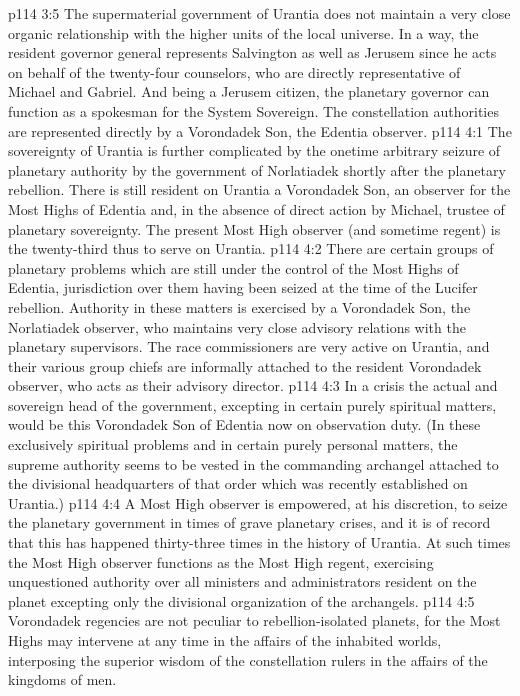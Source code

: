 \vs p114 3:5 The supermaterial government of Urantia does not maintain a very close organic relationship with the higher units of the local universe. In a way, the resident governor general represents Salvington as well as Jerusem since he acts on behalf of the twenty\hyp{}four counselors, who are directly representative of Michael and Gabriel. And being a Jerusem citizen, the planetary governor can function as a spokesman for the System Sovereign. The constellation authorities are represented directly by a Vorondadek Son, the Edentia observer.
\vs p114 4:1 The sovereignty of Urantia is further complicated by the onetime arbitrary seizure of planetary authority by the government of Norlatiadek shortly after the planetary rebellion. There is still resident on Urantia a Vorondadek Son, an observer for the Most Highs of Edentia and, in the absence of direct action by Michael, trustee of planetary sovereignty. The present Most High observer (and sometime regent) is the twenty\hyp{}third thus to serve on Urantia.
\vs p114 4:2 There are certain groups of planetary problems which are still under the control of the Most Highs of Edentia, jurisdiction over them having been seized at the time of the Lucifer rebellion. Authority in these matters is exercised by a Vorondadek Son, the Norlatiadek observer, who maintains very close advisory relations with the planetary supervisors. The race commissioners are very active on Urantia, and their various group chiefs are informally attached to the resident Vorondadek observer, who acts as their advisory director.
\vs p114 4:3 In a crisis the actual and sovereign head of the government, excepting in certain purely spiritual matters, would be this Vorondadek Son of Edentia now on observation duty. (In these exclusively spiritual problems and in certain purely personal matters, the supreme authority seems to be vested in the commanding archangel attached to the divisional headquarters of that order which was recently established on Urantia.)
\pc \vs p114 4:4 A Most High observer is empowered, at his discretion, to seize the planetary government in times of grave planetary crises, and it is of record that this has happened thirty\hyp{}three times in the history of Urantia. At such times the Most High observer functions as the Most High regent, exercising unquestioned authority over all ministers and administrators resident on the planet excepting only the divisional organization of the archangels.\plusone
\vs p114 4:5 Vorondadek regencies are not peculiar to rebellion\hyp{}isolated planets, for the Most Highs may intervene at any time in the affairs of the inhabited worlds, interposing the superior wisdom of the constellation rulers in the affairs of the kingdoms of men.
